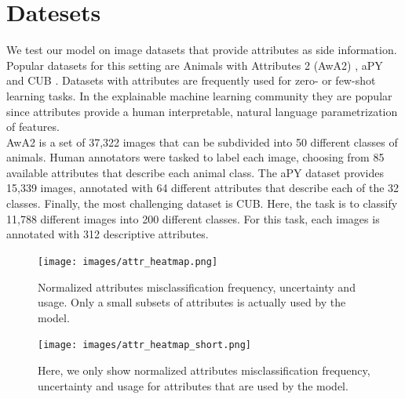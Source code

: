 \documentclass[a4paper,cleardoubleempty,BCOR1cm, 11pt]{report}
\begin{document}
\section{Datesets}
We test our model on image datasets that provide attributes as side information. Popular datasets for this setting are Animals with Attributes 2 (AwA2) \cite{8413121}, aPY \cite{farhadi2009describing} and CUB \cite{WelinderEtal2010}. Datasets with attributes are frequently used for zero- or few-shot learning tasks. In the explainable machine learning community they are popular since attributes provide a human interpretable, natural language parametrization of features.\\
AwA2 is a set of 37,322 images that can be subdivided into 50 different classes of animals. Human annotators were tasked to label each image, choosing from 85 available attributes that describe each animal class. The aPY dataset provides 15,339 images, annotated with 64 different attributes that describe each of the 32 classes. Finally, the most challenging dataset is CUB. Here, the task is to classify 11,788 different images into 200 different classes. For this task, each images is annotated with 312 descriptive attributes.

\begin{figure}[t!]
	\centering
	\texttt{[image: images/attr\_heatmap.png]} 
	\caption{Normalized attributes misclassification frequency, uncertainty and usage. Only a small subsets of attributes is actually used by the model.}
	\label{fig:all_attrs}
\end{figure}
\begin{figure}[t!]
	\centering
	\texttt{[image: images/attr\_heatmap\_short.png]} 
	\caption{Here, we only show normalized attributes misclassification frequency, uncertainty and usage for attributes that are used by the model.}
	\label{fig:less_attrs}
\end{figure}
\end{document}
